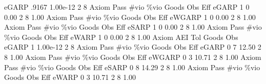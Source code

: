        eGARP {\VBAR}     .9167   1.00e-12          2          8 
{\smallskip}
{\smallskip}
{\smallskip}
       Axiom {\VBAR} Pass        \#vio        \%vio       Goods         Obs         Eff  
       eGARP {\VBAR}    1           0        0.00           2           8        1.00  
{\smallskip}
{\smallskip}
{\smallskip}
       Axiom {\VBAR} Pass        \#vio        \%vio       Goods         Obs         Eff  
      eWGARP {\VBAR}    1           0        0.00           2           8        1.00  
{\smallskip}
{\smallskip}
{\smallskip}
       Axiom {\VBAR} Pass        \#vio        \%vio       Goods         Obs         Eff  
       eSARP {\VBAR}    1           0        0.00           2           8        1.00  
{\smallskip}
{\smallskip}
{\smallskip}
       Axiom {\VBAR} Pass        \#vio        \%vio       Goods         Obs         Eff  
       eWARP {\VBAR}    1           0        0.00           2           8        1.00  
{\smallskip}
       Axiom {\VBAR}       AEI        Tol      Goods        Obs 
       eGARP {\VBAR}         1   1.00e-12          2          8 
{\smallskip}
{\smallskip}
{\smallskip}
       Axiom {\VBAR} Pass        \#vio        \%vio       Goods         Obs         Eff  
       eGARP {\VBAR}    0           7       12.50           2           8        1.00  
{\smallskip}
{\smallskip}
{\smallskip}
       Axiom {\VBAR} Pass        \#vio        \%vio       Goods         Obs         Eff  
      eWGARP {\VBAR}    0           3       10.71           2           8        1.00  
{\smallskip}
{\smallskip}
{\smallskip}
       Axiom {\VBAR} Pass        \#vio        \%vio       Goods         Obs         Eff  
       eSARP {\VBAR}    0           8       14.29           2           8        1.00  
{\smallskip}
{\smallskip}
{\smallskip}
       Axiom {\VBAR} Pass        \#vio        \%vio       Goods         Obs         Eff  
       eWARP {\VBAR}    0           3       10.71           2           8        1.00  

